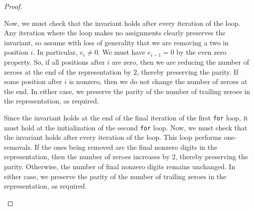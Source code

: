 \documentclass[english,12pt]{article}
\newcommand{\seq}{\p}
\begin{document}
\begin{proof}
\begin{description}
\begin{description}
Now, we must check that the invariant holds after every iteration of the loop.
Any iteration where the loop makes no assignments clearly preserves the invariant, so assume with loss of generality that we are removing a two in position $i$.  In particular, $e_i\neq0$.  We must have $e_{i-1}=0$ by the even zero property.  So, if all positions after $i$ are zero, then we are reducing the number of zeroes at the end of the representation by $2$, thereby preserving the parity.  If some position after $i$ is nonzero, then we do not change the number of zeroes at the end.  In either case, we preserve the parity of the number of trailing zeroes in the representation, as required.
\item[Second \texttt{for} loop:] Since the invariant holds at the end of the final iteration of the first \texttt{for} loop, it must hold at the initialization of the second \texttt{for} loop.  Now, we must check that the invariant holds after every iteration of the loop.  This loop performs one-removals.  If the ones being removed are the final nonzero digits in the representation, then the number of zeroes increases by $2$, thereby preserving the parity.  Otherwise, the number of final nonzero digits remains unchanged.  In either case, we preserve the parity of the number of trailing zeroes in the representation, as required.
\end{description}

\end{description}
\end{proof}
\end{document}
